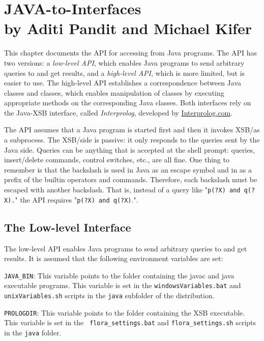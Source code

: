 

\chapter[JAVA-to-\FLSYSTEM Interfaces]
{JAVA-to-\FLSYSTEM Interfaces\\
  {\Large by Aditi Pandit and Michael Kifer}}


This chapter documents the API for accessing \FLSYSTEM from Java
programs.  The API has two versions: a \emph{low-level API}, which
enables Java programs to send arbitrary queries to \FLSYSTEM and
get results, and a \emph{high-level API}, which is more limited,
but is easier to use. The high-level API establishes a
correspondence between Java classes and \FLSYSTEM classes, which
enables manipulation of \FLSYSTEM classes by executing appropriate
methods on the corresponding Java classes. Both interfaces rely on
the Java-XSB interface, called \emph{Interprolog}, developed by
\url{Interprolog.com}.

The API assumes that a Java program is started first and then it invokes
XSB/\FLSYSTEM as a subprocess. The XSB/\FLSYSTEM side is passive: it only
responds to the queries sent by the Java side.
Queries can be anything that is accepted at the \FLSYSTEM
shell prompt: queries, insert/delete commands, control switches, etc., are
all fine.
One thing to remember is that the backslash is used in Java
as an escape symbol and in \FLSYSTEM as a prefix of the builtin operators
and commands. Therefore, each backslash must be escaped with another
backslash. That is, instead of a query like "\texttt{p(?X) \bs{}and q(?X).}"
the API requires "\texttt{p(?X) \bs{}\bs{}and q(?X)}.".


\section{The Low-level Interface} \label{sec-java-lowlevel}
 The low-level API enables Java programs to send arbitrary queries
to \FLSYSTEM and get results. 
It is assumed that the following environment variables are set:

{\tt JAVA\_BIN}: This variable points to the folder containing
the javac and java executable programs. This variable is set in
the {\tt windowsVariables.bat} and  {\tt unixVariables.sh}  scripts in the
{\tt java} subfolder of the \FLSYSTEM distribution.

\texttt{PROLOGDIR}: 
This variable points to the folder
containing the XSB executable. This variable is set in the {\tt
  flora\_settings.bat} and {\tt flora\_settings.sh} scripts in the {\tt java}
folder. 

